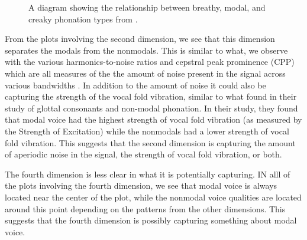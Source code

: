 \begin{figure}[h!]
    \centering
    \caption{A diagram showing the relationship between breathy, modal, and creaky phonation types from \citet{gordonPhonationTypesCrosslinguistic2001}.}
    \label{fig:phonation_types}
\end{figure}

From the plots involving the second dimension, we see that this dimension separates the modals from the nonmodals. This is similar to what, we observe with the various harmonics-to-noise ratios and cepstral peak prominence (CPP) which are all measures of the the amount of noise present in the signal across various bandwidths \citep{dekromCepstrumBasedTechniqueDetermining1993,blankenshipTimingNonmodalPhonation2002,ferrerriesgoWhatMakesCepstral2020}. In addition to the amount of noise it could also be capturing the strength of the vocal fold vibration, similar to what \citet{garellekVoicingGlottalConsonants2021} found in their study of glottal consonants and non-modal phonation. In their study, they found that modal voice had the highest strength of vocal fold vibration (as measured by the Strength of Excitation) while the nonmodals had a lower strength of vocal fold vibration. This suggests that the second dimension is capturing the amount of aperiodic noise in the signal, the strength of vocal fold vibration, or both.

The fourth dimension is less clear in what it is potentially capturing. IN alll of the plots involving the fourth dimension, we see that modal voice is always located near the center of the plot, while the nonmodal voice qualities are located around this point depending on the patterns from the other dimensions. This suggests that the fourth dimension is possibly capturing something about modal voice. 

